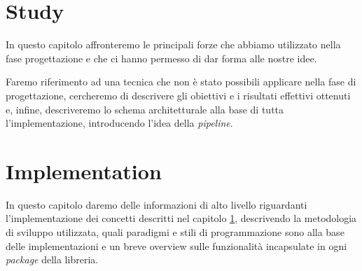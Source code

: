 \documentclass[twoside,openright,titlepage,fleqn,
	headinclude,11pt,a4paper,BCOR5mm,footinclude
	]{scrbook}
\begin{document}
\frenchspacing
\raggedbottom
{}
\pagestyle{plain}

\pagestyle{scrheadings}

\lstset{
	language = java
	, numbers = left 
	, basicstyle=\sffamily%
	, tabsize=2
	, captionpos=b
	, breaklines=true
	, showspaces=false
	, showstringspaces=false
}

\tableofcontents

% 

% 

% 






\chapter{Study}
\label{chapter:study}

In questo capitolo affronteremo le principali forze che abbiamo
utilizzato nella fase progettazione e che ci hanno permesso di dar
forma alle nostre idee. 

Faremo riferimento ad una tecnica che non \`e stato possibili
applicare nella fase di progettazione, cercheremo di descrivere gli
obiettivi e i risultati effettivi ottenuti e, infine, descriveremo lo
schema architetturale alla base di tutta l'implementazione,
introducendo l'idea della \emph{pipeline}.



% 


\chapter{Implementation}
\label{chapter:implementation}
In questo capitolo daremo delle informazioni di alto livello
riguardanti l'implementazione dei concetti descritti nel capitolo
\ref{chapter:study}, descrivendo la metodologia di sviluppo
utilizzata, quali paradigmi e stili di programmazione sono alla base
delle implementazioni e un breve overview sulle funzionalit\`a
incapsulate in ogni \emph{package} della libreria.
\end{document}
